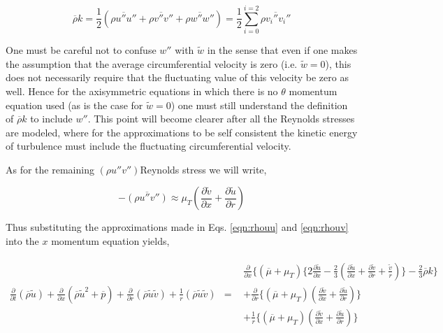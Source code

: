 \begin{equation}
	\overline{\rho} k = \frac {1}{2}(\overline{\rho u'' u''} + \overline{\rho v'' v''} + \overline{\rho w'' w''}) =
	\frac{1}{2}\sum_{i=0}^{i=2}\overline{\rho v_i'' v_i''}
\label{eqn:rhok}
\end{equation} 

	One must be careful not to confuse $w''$ with $\tilde{w}$ in the sense that even if one makes the assumption
that the average circumferential velocity is zero (i.e. $\tilde{w}=0$), this does not necessarily require that the 
fluctuating value of this velocity be zero as well.  Hence for the axisymmetric equations in which there is no
$\theta$ momentum equation used (as is the case for $\tilde{w}=0$) one must still understand the definition of 
$\overline{\rho} k$ to include $w''$.  This point will become clearer after all the Reynolds stresses are modeled, 
where for the approximations to be self consistent the kinetic energy of turbulence must include the fluctuating 
circumferential velocity.

	As for the remaining $(\rho u'' v'')$Reynolds stress we will write,

\begin{equation}
	-\overline{(\rho u'' v'')} \approx \mu_T(\frac{\partial \tilde{v}}{\partial x} + \frac{\partial \tilde{u}}{\partial r})
\label{eqn:rhouv}
\end{equation}

	Thus substituting the approximations made in Eqs. \ref{eqn:rhouu} and \ref{eqn:rhouv} into the $x$ momentum 
equation yields,

\begin{displaymath}
	\begin{array}{ccc}
	\frac{\partial}{\partial t}(\overline{\rho}\tilde{u}) + \frac{\partial}{\partial x}(
	\overline{\rho}\tilde{u}^2 + \overline{p}) + \frac{\partial}{\partial r}(
	\overline{\rho}\tilde{u}\tilde{v}) + \frac{1}{r}(\overline{\rho}\tilde{u}\tilde{v})
	& = & 
		\begin{array}{c} 
	\frac{\partial}{\partial x}\Bigg\{(\overline{\mu}+\mu_T)
	\Big\{2\frac{\partial \tilde{u}}{\partial x} - \frac{2}{3}(\frac{\partial \tilde{u}}
	{\partial x} + \frac{\partial \tilde{v}}{\partial r} + \frac{\tilde{v}}{r})\Big\} -\frac{2}{3}\overline{\rho}k \Bigg\}
	\\ 
	+ \frac{\partial}{\partial r}\Big\{(\overline{\mu} + \mu_T) 
	(\frac{\partial \tilde{v}}{\partial x} + \frac{\partial \tilde{u}}{\partial r})\Big\}\\
	+ \frac{1}{r}\Big\{(\overline{\mu} + \mu_T)
	(\frac{\partial \tilde{v}}{\partial x} + \frac{\partial \tilde{u}}{\partial r})\Big\}	
		\end{array}
	\end{array}
\end{displaymath}

